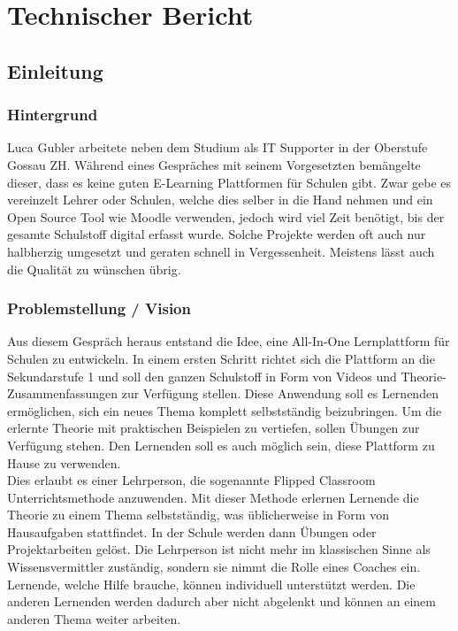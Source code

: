 \section{Technischer Bericht}
\subsection{Einleitung}

\subsubsection{Hintergrund}
Luca Gubler arbeitete neben dem Studium als IT Supporter in der Oberstufe Gossau ZH. Während eines Gespräches mit seinem Vorgesetzten bemängelte dieser, dass es keine guten E-Learning Plattformen für Schulen gibt. Zwar gebe es vereinzelt Lehrer oder Schulen, welche dies selber in die Hand nehmen und ein Open Source Tool wie Moodle verwenden, jedoch wird viel Zeit benötigt, bis der gesamte Schulstoff digital erfasst wurde. Solche Projekte werden oft auch nur halbherzig umgesetzt und geraten schnell in Vergessenheit. Meistens lässt auch die Qualität zu wünschen übrig.

\subsubsection{Problemstellung / Vision}
Aus diesem Gespräch heraus entstand die Idee, eine All-In-One Lernplattform für Schulen zu entwickeln. In einem ersten Schritt richtet sich die Plattform an die Sekundarstufe 1 und soll den ganzen Schulstoff in Form von Videos und Theorie-Zusammenfassungen zur Verfügung stellen. Diese Anwendung soll es Lernenden ermöglichen, sich ein neues Thema komplett selbstständig beizubringen. Um die erlernte Theorie mit praktischen Beispielen zu vertiefen, sollen Übungen zur Verfügung stehen. Den Lernenden soll es auch möglich sein, diese Plattform zu Hause zu verwenden. \\

Dies erlaubt es einer Lehrperson, die sogenannte Flipped Classroom Unterrichtsmethode anzuwenden. Mit dieser Methode erlernen Lernende die Theorie zu einem Thema selbstständig, was üblicherweise in Form von Hausaufgaben stattfindet. In der Schule werden dann Übungen oder Projektarbeiten gelöst. Die Lehrperson ist nicht mehr im klassischen Sinne als Wissensvermittler zuständig, sondern sie nimmt die Rolle eines Coaches ein. Lernende, welche Hilfe brauche, können individuell unterstützt werden. Die anderen Lernenden werden dadurch aber nicht abgelenkt und können an einem anderen Thema weiter arbeiten. \\

